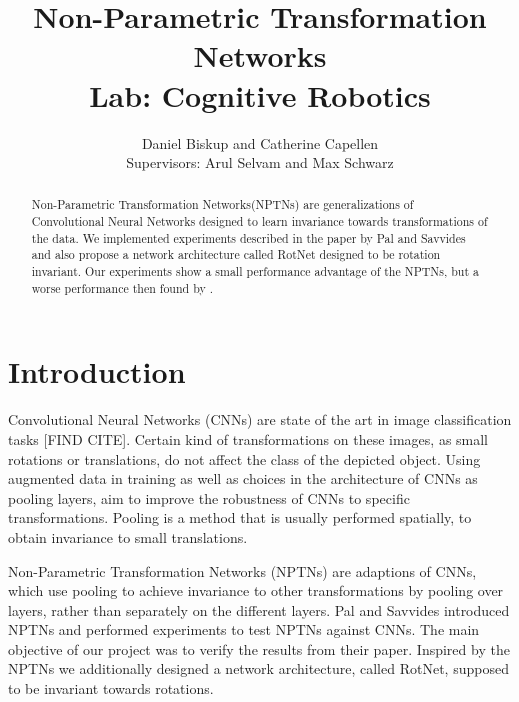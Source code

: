 \documentclass{llncs}
\begin{document}
\pagestyle{headings}  %
%
\mainmatter              %
%
\title{Non-Parametric Transformation Networks \\Lab: Cognitive Robotics}
%
%  
%
\author{Daniel Biskup and Catherine Capellen
 \\Supervisors: Arul Selvam and Max Schwarz}
%
%
%

\maketitle              %
\begin{abstract} Non-Parametric Transformation Networks(NPTNs) are generalizations of Convolutional Neural Networks designed to learn invariance towards transformations of the data. 
We implemented experiments described in the paper by Pal and Savvides \cite{NPTN18} and also propose a network architecture called RotNet designed to be rotation invariant. Our experiments show a small performance advantage of the NPTNs, but a worse performance then found by \cite{NPTN18}.

\end{abstract}
\section{Introduction}
Convolutional Neural Networks (CNNs) are state of the art in image classification tasks [FIND CITE]. Certain kind of transformations on these images, as small rotations or translations, do not affect the class of the depicted object.  
Using augmented data in training as well as choices in the architecture of CNNs as pooling layers, aim to improve the robustness of CNNs to specific transformations. 
Pooling is a method that is usually performed spatially, to obtain invariance to small translations. 

Non-Parametric Transformation Networks (NPTNs) are adaptions of CNNs, which use pooling to achieve invariance to other transformations by pooling over layers, rather than separately on the different layers.
Pal and Savvides \cite{NPTN18} introduced NPTNs and performed experiments to test NPTNs against CNNs. The main objective of our project was to verify the results from their paper. 
Inspired by the NPTNs we additionally designed a network architecture, called RotNet, supposed to be invariant towards rotations.
\end{document}

